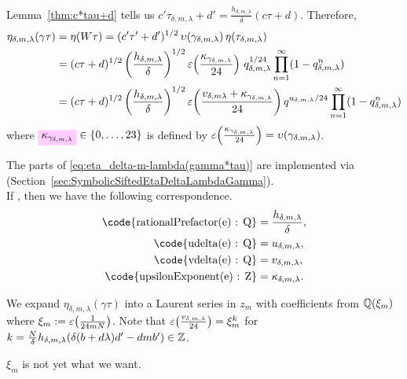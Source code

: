 \documentclass{article}
\begin{document}
Lemma~\ref{thm:c*tau+d} tells us
$c'\tau_{\delta,m,\lambda}+d' = \frac{h_{\delta,m,\lambda}}{\delta} (c \tau + d)$.
%
Therefore,
\begin{align}
  \eta_{\delta,m,\lambda}(\gamma \tau)
  &= \eta(W \tau)
    = (c'\tau'+d')^{1/2} \, \upsilon(\gamma_{\delta,m,\lambda})
    \,\eta(\tau_{\delta,m,\lambda})\notag\\
  &=
    (c\tau+d)^{1/2}
    \left(\frac{h_{\delta,m,\lambda}}{\delta}\right)^{1/2}
    \varepsilon\!\left(\frac{\kappa_{\gamma_{\delta,m,\lambda}}}{24}\right) \,
    q_{\delta,m,\lambda}^{1/24}
    \prod_{n=1}^\infty (1-q_{\delta,m,\lambda}^n)\notag\\
  &=
    (c\tau+d)^{1/2}
    \left(\frac{h_{\delta,m,\lambda}}{\delta}\right)^{1/2}
    \varepsilon\!\left(\frac{ v_{\delta,m\lambda} + \kappa_{\gamma_{\delta,m,\lambda}}}{24}\right)
    q^{u_{\delta,m,\lambda}/24}
    \prod_{n=1}^\infty (1-q_{\delta,m,\lambda}^n)
    \label{eq:eta_delta-m-lambda(gamma*tau)}
\end{align}
where
$\defineNotation[kappa-gamma-delta-m-lambda]{\kappa_{\gamma_{\delta,m,\lambda}}}
\in \Set{0,\ldots,23}$ is defined by
$\varepsilon\!\left(\frac{\kappa_{\gamma_{\delta,m,\lambda}}}{24}\right) =
\upsilon(\gamma_{\delta,m,\lambda})$.

The parts of \eqref{eq:eta_delta-m-lambda(gamma*tau)} are implemented
via \textcolor{blue}{}
(Section~\ref{sec:SymbolicSiftedEtaDeltaLambdaGamma}).
\\
If , then we have the
following correspondence.
\begin{align*}
  \text{\code{rationalPrefactor(e) : Q}}
  &=
    \frac{h_{\delta,m,\lambda}}{\delta},
  \\
  \text{\code{udelta(e) : Q}}
  &=
    u_{\delta,m,\lambda},
  \\
  \text{\code{vdelta(e) : Q}}
  &=
    v_{\delta,m,\lambda},
  \\
  \text{\code{upsilonExponent(e) : Z}}
  &=
    \kappa_{\delta,m,\lambda}.
\end{align*}



We expand $\eta_{\delta,m,\lambda}(\gamma \tau)$ into a Laurent series
in $z_m$ with coefficients from $\mathbb{Q}(\xi_m)$ where
$\xi_m := \varepsilon\!\left(\frac{1}{24 m N}\right)$. Note that
$\varepsilon\!\left(\frac{v_{\delta,m,\lambda}}{24}\right)=\xi_m^k$ for
$k=\frac{N}{\delta} h_{\delta,m,\lambda}(\delta (b + d \lambda) d' - d
m b') \in \mathbb{Z}$.
\begin{Hemmecke}
  $\xi_m$ is not yet what we want.
\end{Hemmecke}
\end{document}
